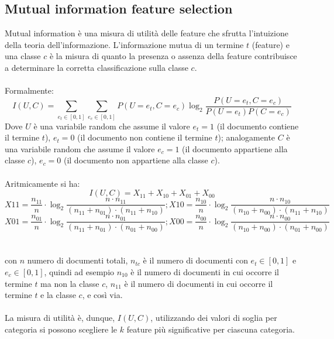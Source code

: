 \documentclass{article}
\theoremstyle{plain}
\theoremstyle{definition}
\begin{document}
\subsection{Mutual information feature selection}
Mutual information è una misura di utilità delle feature che sfrutta l'intuizione della teoria dell'informazione. L'informazione mutua di un termine $t$ (feature) e una classe $c$ è la misura di quanto la presenza o assenza della feature contribuisce a determinare la corretta classificazione sulla classe $c$.
\\
\\
Formalmente:
$$I(U,C)=\sum_{e_t \in [0,1]} \sum_{e_c \in [0,1]} P(U=e_t, C=e_c) \log_2 \frac{P(U=e_t, C=e_c)}{P(U=e_t)P(C=e_c)}$$
Dove $U$ è una variabile random che assume il valore $e_t=1$ (il documento contiene il termine $t$), $e_t=0$ (il documento non contiene il termine $t$); analogamente $C$ è una variabile random che assume il valore $e_c=1$ (il documento appartiene alla classe $c$), $e_c=0$ (il documento non appartiene alla classe $c$).
\\
\\
Aritmicamente si ha:
$$I(U,C)=X_{11}+X_{10}+X_{01}+X_{00}$$
$$X{11}=\frac{n_{11}}{n} \cdot \log_2 \frac{n \cdot n_{11}}{(n_{11}+n_{01})\cdot(n_{11}+n_{10})};
X{10}=\frac{n_{10}}{n} \cdot \log_2 \frac{n \cdot n_{10}}{(n_{10}+n_{00})\cdot(n_{11}+n_{10})}$$
$$X{01}=\frac{n_{01}}{n} \cdot \log_2 \frac{n \cdot n_{01}}{(n_{11}+n_{01})\cdot(n_{01}+n_{00})};
X{00}=\frac{n_{00}}{n} \cdot \log_2 \frac{n \cdot n_{00}}{(n_{10}+n_{00})\cdot(n_{01}+n_{00})}$$
\\
\\
con $n$ numero di documenti totali, $n_{tc}$ è il numero di documenti con $e_t \in [0,1]$ e $e_c \in [0,1]$, quindi ad esempio $n_{10}$ è il numero di documenti in cui occorre il termine $t$ ma non la classe $c$, $n_{11}$ è il numero di documenti in cui occorre il termine $t$ e la classe $c$, e così via.
\\
\\
La misura di utilità è, dunque, $I(U,C)$, utilizzando dei valori di soglia per categoria si possono scegliere le $k$ feature più significative per ciascuna categoria.
\end{document}

